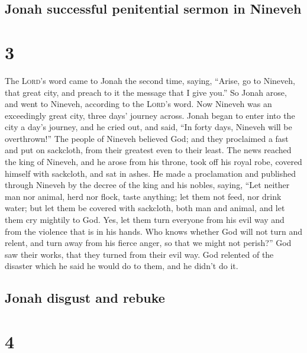 \hypertarget{jonah-successful-penitential-sermon-in-nineveh}{%
\subsection{Jonah successful penitential sermon in
Nineveh}\label{jonah-successful-penitential-sermon-in-nineveh}}

\hypertarget{section-2}{%
\section{3}\label{section-2}}

 The \textsc{Lord}'s word came to Jonah the second time,
saying,  ``Arise, go to Nineveh, that great city, and
preach to it the message that I give you.''  So Jonah
arose, and went to Nineveh, according to the \textsc{Lord}'s word. Now
Nineveh was an exceedingly great city, three days' journey across.
 Jonah began to enter into the city a day's journey, and
he cried out, and said, ``In forty days, Nineveh will be overthrown!''
 The people of Nineveh believed God; and they proclaimed a
fast and put on sackcloth, from their greatest even to their least.
 The news reached the king of Nineveh, and he arose from
his throne, took off his royal robe, covered himself with sackcloth, and
sat in ashes.  He made a proclamation and published
through Nineveh by the decree of the king and his nobles, saying, ``Let
neither man nor animal, herd nor flock, taste anything; let them not
feed, nor drink water;  but let them be covered with
sackcloth, both man and animal, and let them cry mightily to God. Yes,
let them turn everyone from his evil way and from the violence that is
in his hands.  Who knows whether God will not turn and
relent, and turn away from his fierce anger, so that we might not
perish?''  God saw their works, that they turned from
their evil way. God relented of the disaster which he said he would do
to them, and he didn't do it.

\hypertarget{jonah-disgust-and-rebuke}{%
\subsection{Jonah disgust and rebuke}\label{jonah-disgust-and-rebuke}}

\hypertarget{section-3}{%
\section{4}\label{section-3}}

